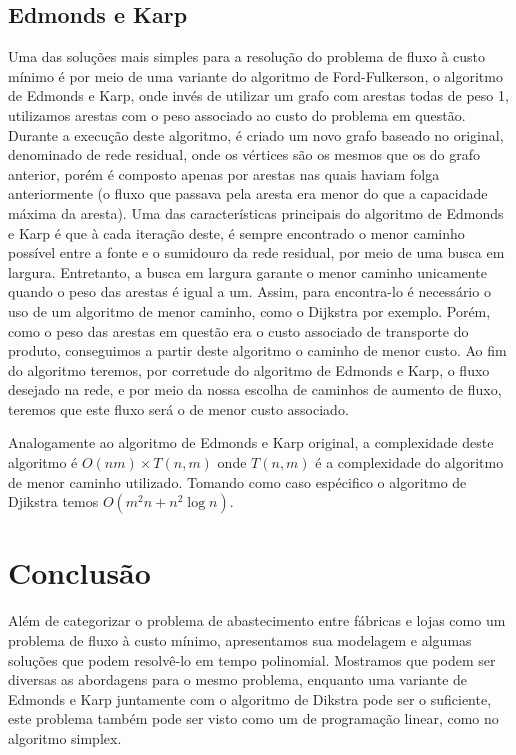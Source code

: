 \documentclass[12pt, a4]{article}
\begin{document}
\subsection{Edmonds e Karp}

Uma das soluções mais simples para a resolução do problema de fluxo à custo
mínimo é por meio de uma variante do algoritmo de Ford-Fulkerson, o algoritmo de
Edmonds e Karp, onde invés de utilizar um grafo com arestas todas de peso 1,
utilizamos arestas com o peso associado ao custo do problema em questão. Durante
a execução deste algoritmo, é criado um novo grafo baseado no original,
denominado de rede residual, onde os vértices são os mesmos que os do grafo
anterior, porém é composto apenas por arestas nas quais haviam folga
anteriormente (o fluxo que passava pela aresta era menor do que a capacidade
máxima da aresta). Uma das características principais do algoritmo de Edmonds e
Karp é que à cada iteração deste, é sempre encontrado o menor caminho possível
entre a fonte e o sumidouro da rede residual, por meio de uma busca em largura.
Entretanto, a busca em largura garante o menor caminho unicamente quando o peso
das arestas é igual a um. Assim, para encontra-lo é necessário o uso de um
algoritmo de menor caminho, como o Dijkstra por exemplo. Porém, como o peso das
arestas em questão era o custo associado de transporte do produto, conseguimos a
partir deste algoritmo o caminho de menor custo. Ao fim do algoritmo teremos,
por corretude do algoritmo de Edmonds e Karp, o fluxo desejado na rede, e por
meio da nossa escolha de caminhos de aumento de fluxo, teremos que este fluxo
será o de menor custo associado.

Analogamente ao algoritmo de Edmonds e Karp original, a complexidade deste
algoritmo é $O(nm) \times T(n,m)$ onde $T(n,m)$ é a complexidade do algoritmo de
menor caminho utilizado. Tomando como caso espécifico o algoritmo de Djikstra
temos $O(m^2 n + n^2 \log n)$.

\section{Conclusão}

Além de categorizar o problema de abastecimento entre fábricas e lojas como um
problema de fluxo à custo mínimo, apresentamos sua modelagem e algumas soluções
que podem resolvê-lo em tempo polinomial. Mostramos que podem ser diversas as
abordagens para o mesmo problema, enquanto uma variante de Edmonds e Karp
juntamente com o algoritmo de Dikstra pode ser o suficiente, este problema
também pode ser visto como um de programação linear, como no algoritmo simplex.
\end{document}
